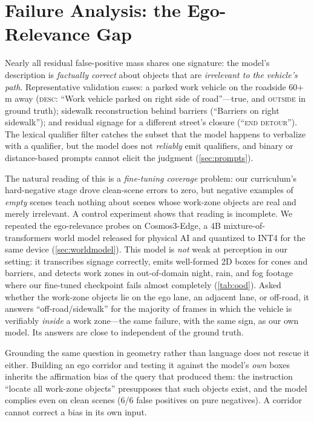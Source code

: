 
\section{Failure Analysis: the Ego-Relevance Gap}
\label{sec:analysis}

Nearly all residual false-positive mass shares one signature: the model's description is \emph{factually correct} about objects that are \emph{irrelevant to the vehicle's path}.  Representative validation cases: a parked work vehicle on the roadside 60+\,m away (\textsc{desc}: ``Work vehicle parked on right side of road''---true, and \textsc{outside} in ground truth); sidewalk reconstruction behind barriers (``Barriers on right sidewalk''); and residual signage for a different street's closure (``\textsc{end detour}'').  The lexical qualifier filter catches the subset that the model happens to verbalize with a qualifier, but the model does not \emph{reliably} emit qualifiers, and binary or distance-based prompts cannot elicit the judgment (\cref{sec:prompts}).

The natural reading of this is a \emph{fine-tuning coverage} problem: our curriculum's hard-negative stage drove clean-scene errors to zero, but negative examples of \emph{empty} scenes teach nothing about scenes whose work-zone objects are real and merely irrelevant.  A control experiment shows that reading is incomplete.  We repeated the ego-relevance probes on Cosmos3-Edge, a 4B mixture-of-transformers world model released for physical AI and quantized to INT4 for the same device (\cref{sec:worldmodel}).  This model is \emph{not} weak at perception in our setting: it transcribes signage correctly, emits well-formed 2D boxes for cones and barriers, and detects work zones in out-of-domain night, rain, and fog footage where our fine-tuned checkpoint fails almost completely (\cref{tab:ood}).  Asked whether the work-zone objects lie on the ego lane, an adjacent lane, or off-road, it answers ``off-road/sidewalk'' for the majority of frames in which the vehicle is verifiably \emph{inside} a work zone---the same failure, with the same sign, as our own model.  Its answers are close to independent of the ground truth.

Grounding the same question in geometry rather than language does not rescue it either.  Building an ego corridor and testing it against the model's \emph{own} boxes inherits the affirmation bias of the query that produced them: the instruction ``locate all work-zone objects'' presupposes that such objects exist, and the model complies even on clean scenes (6/6 false positives on pure negatives).  A corridor cannot correct a bias in its own input.

